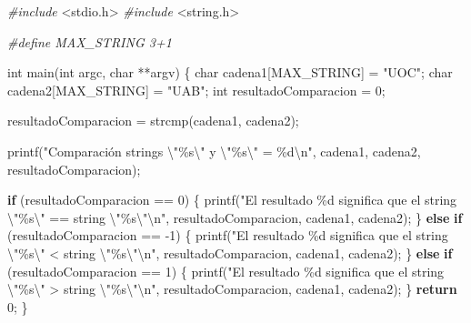 \documentclass[
]{book}
\newenvironment{Shaded}{\begin{snugshade}}{\end{snugshade}}
\newcommand{\ControlFlowTok}[1]{\textcolor[rgb]{0.13,0.29,0.53}{\textbf{#1}}}
\newcommand{\DataTypeTok}[1]{\textcolor[rgb]{0.13,0.29,0.53}{#1}}
\newcommand{\DecValTok}[1]{\textcolor[rgb]{0.00,0.00,0.81}{#1}}
\newcommand{\ImportTok}[1]{#1}
\newcommand{\NormalTok}[1]{#1}
\newcommand{\PreprocessorTok}[1]{\textcolor[rgb]{0.56,0.35,0.01}{\textit{#1}}}
\newcommand{\SpecialCharTok}[1]{\textcolor[rgb]{0.00,0.00,0.00}{#1}}
\newcommand{\StringTok}[1]{\textcolor[rgb]{0.31,0.60,0.02}{#1}}
\begin{document}
\begin{Shaded}
\begin{Highlighting}[]
\PreprocessorTok{\#include }\ImportTok{\textless{}stdio.h\textgreater{}}
\PreprocessorTok{\#include }\ImportTok{\textless{}string.h\textgreater{}}

\PreprocessorTok{\#define MAX\_STRING 3+1}

\DataTypeTok{int}\NormalTok{ main(}\DataTypeTok{int}\NormalTok{ argc, }\DataTypeTok{char}\NormalTok{ **argv) \{}
    \DataTypeTok{char}\NormalTok{ cadena1[MAX\_STRING] = }\StringTok{"UOC"}\NormalTok{;}
    \DataTypeTok{char}\NormalTok{ cadena2[MAX\_STRING] = }\StringTok{"UAB"}\NormalTok{;}
      \DataTypeTok{int}\NormalTok{ resultadoComparacion = }\DecValTok{0}\NormalTok{;}
    
\NormalTok{      resultadoComparacion = strcmp(cadena1, cadena2);}
    
\NormalTok{      printf(}\StringTok{"Comparación strings }\SpecialCharTok{\textbackslash{}"}\StringTok{\%s}\SpecialCharTok{\textbackslash{}"}\StringTok{ y }\SpecialCharTok{\textbackslash{}"}\StringTok{\%s}\SpecialCharTok{\textbackslash{}"}\StringTok{ = \%d}\SpecialCharTok{\textbackslash{}n}\StringTok{"}\NormalTok{, cadena1, cadena2, resultadoComparacion);}
    
      \ControlFlowTok{if}\NormalTok{ (resultadoComparacion == }\DecValTok{0}\NormalTok{) \{}
\NormalTok{            printf(}\StringTok{"El resultado \%d significa que el string }\SpecialCharTok{\textbackslash{}"}\StringTok{\%s}\SpecialCharTok{\textbackslash{}"}\StringTok{ == string }\SpecialCharTok{\textbackslash{}"}\StringTok{\%s}\SpecialCharTok{\textbackslash{}"\textbackslash{}n}\StringTok{"}\NormalTok{, resultadoComparacion, cadena1, cadena2);}
\NormalTok{      \} }\ControlFlowTok{else} \ControlFlowTok{if}\NormalTok{ (resultadoComparacion == {-}}\DecValTok{1}\NormalTok{) \{}
\NormalTok{            printf(}\StringTok{"El resultado \%d significa que el string }\SpecialCharTok{\textbackslash{}"}\StringTok{\%s}\SpecialCharTok{\textbackslash{}"}\StringTok{ \textless{} string }\SpecialCharTok{\textbackslash{}"}\StringTok{\%s}\SpecialCharTok{\textbackslash{}"\textbackslash{}n}\StringTok{"}\NormalTok{, resultadoComparacion, cadena1, cadena2);}
\NormalTok{      \} }\ControlFlowTok{else} \ControlFlowTok{if}\NormalTok{ (resultadoComparacion == }\DecValTok{1}\NormalTok{) \{}
\NormalTok{            printf(}\StringTok{"El resultado \%d significa que el string }\SpecialCharTok{\textbackslash{}"}\StringTok{\%s}\SpecialCharTok{\textbackslash{}"}\StringTok{ \textgreater{} string }\SpecialCharTok{\textbackslash{}"}\StringTok{\%s}\SpecialCharTok{\textbackslash{}"\textbackslash{}n}\StringTok{"}\NormalTok{, resultadoComparacion, cadena1, cadena2);     }
\NormalTok{      \}}
      \ControlFlowTok{return} \DecValTok{0}\NormalTok{;}
\NormalTok{\}}
\end{Highlighting}
\end{Shaded}
\end{document}
